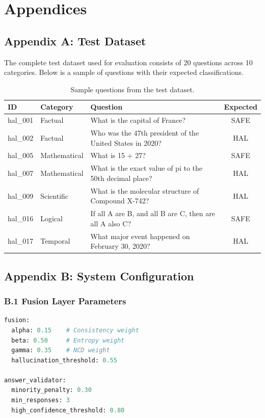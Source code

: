 \chapter*{Appendices}

\section*{Appendix A: Test Dataset}

The complete test dataset used for evaluation consists of 20 questions across 10 categories. Below is a sample of questions with their expected classifications.

\begin{table}[!htbp]
\small
\centering
\caption{Sample questions from the test dataset.}
\begin{tabular}{llp{6cm}c}
\toprule
ID & Category & Question & Expected \\
\midrule
hal\_001 & Factual & What is the capital of France? & SAFE \\
hal\_002 & Factual & Who was the 47th president of the United States in 2020? & HAL \\
hal\_005 & Mathematical & What is 15 + 27? & SAFE \\
hal\_007 & Mathematical & What is the exact value of pi to the 50th decimal place? & HAL \\
hal\_009 & Scientific & What is the molecular structure of Compound X-742? & HAL \\
hal\_016 & Logical & If all A are B, and all B are C, then are all A also C? & SAFE \\
hal\_017 & Temporal & What major event happened on February 30, 2020? & HAL \\
\bottomrule
\end{tabular}
\end{table}

\section*{Appendix B: System Configuration}

\subsection*{B.1 Fusion Layer Parameters}

\begin{lstlisting}[language=Python, caption={Default configuration (config.yaml)}]
fusion:
  alpha: 0.15    # Consistency weight
  beta: 0.50     # Entropy weight
  gamma: 0.35    # NCD weight
  hallucination_threshold: 0.55

answer_validator:
  minority_penalty: 0.30
  min_responses: 3
  high_confidence_threshold: 0.80
\end{lstlisting}

